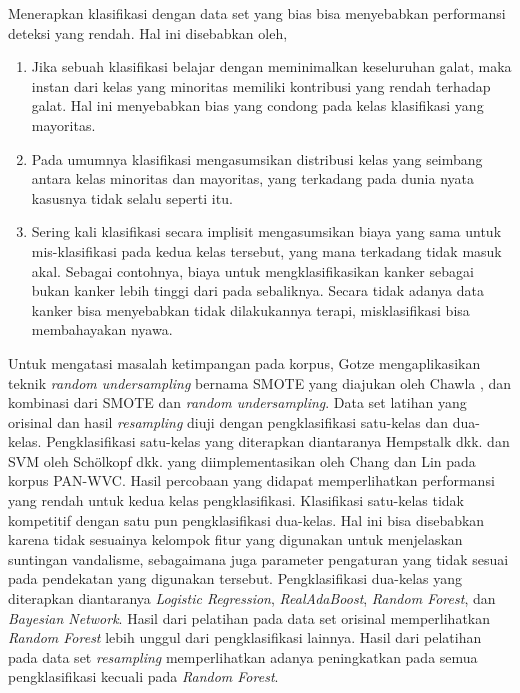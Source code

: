 \documentclass[12pt,a4paper,titlepage]{article}
\begin{document}
Menerapkan klasifikasi dengan data set yang bias bisa menyebabkan performansi deteksi yang rendah.
Hal ini disebabkan oleh,
\begin{enumerate}
	\item Jika sebuah klasifikasi belajar dengan meminimalkan keseluruhan galat, maka instan dari kelas yang minoritas memiliki kontribusi yang rendah terhadap galat.
Hal ini menyebabkan bias yang condong pada kelas klasifikasi yang mayoritas.
	\item Pada umumnya klasifikasi mengasumsikan distribusi kelas yang seimbang antara kelas minoritas dan mayoritas, yang terkadang pada dunia nyata kasusnya tidak selalu seperti itu.
	\item Sering kali klasifikasi secara implisit mengasumsikan biaya yang sama untuk mis-klasifikasi pada kedua kelas tersebut, yang mana terkadang tidak masuk akal.
Sebagai contohnya, biaya untuk mengklasifikasikan kanker sebagai bukan kanker lebih tinggi dari pada sebaliknya. 
Secara tidak adanya data kanker bisa menyebabkan tidak dilakukannya terapi, misklasifikasi bisa membahayakan nyawa.
\end{enumerate}

Untuk mengatasi masalah ketimpangan pada korpus, Gotze \cite{gotze2014advanced} mengaplikasikan teknik \textit{random undersampling} bernama SMOTE yang diajukan oleh Chawla \cite{chawla2002smote}, dan kombinasi dari SMOTE dan \textit{random undersampling}.
Data set latihan yang orisinal dan hasil \textit{resampling} diuji dengan pengklasifikasi satu-kelas dan dua-kelas.  
Pengklasifikasi satu-kelas yang diterapkan diantaranya Hempstalk dkk. \cite{hempstalk2008one} dan SVM oleh Schölkopf dkk. \cite{scholkopf1999support} yang diimplementasikan oleh Chang dan Lin \cite{chang2011libsvm} pada korpus PAN-WVC.
Hasil percobaan yang didapat memperlihatkan performansi yang rendah untuk kedua kelas pengklasifikasi. Klasifikasi satu-kelas tidak kompetitif dengan satu pun pengklasifikasi dua-kelas.
Hal ini bisa disebabkan karena tidak sesuainya kelompok fitur yang digunakan untuk menjelaskan suntingan vandalisme, sebagaimana juga parameter pengaturan yang tidak sesuai pada pendekatan yang digunakan tersebut.
Pengklasifikasi dua-kelas yang diterapkan diantaranya \textit{Logistic Regression}, \textit{RealAdaBoost}, \textit{Random Forest}, dan \textit{Bayesian Network}.
Hasil dari pelatihan pada data set orisinal memperlihatkan \textit{Random Forest} lebih unggul dari pengklasifikasi lainnya.
Hasil dari pelatihan pada data set \textit{resampling} memperlihatkan adanya peningkatkan pada semua pengklasifikasi kecuali pada \textit{Random Forest}.
\end{document}
